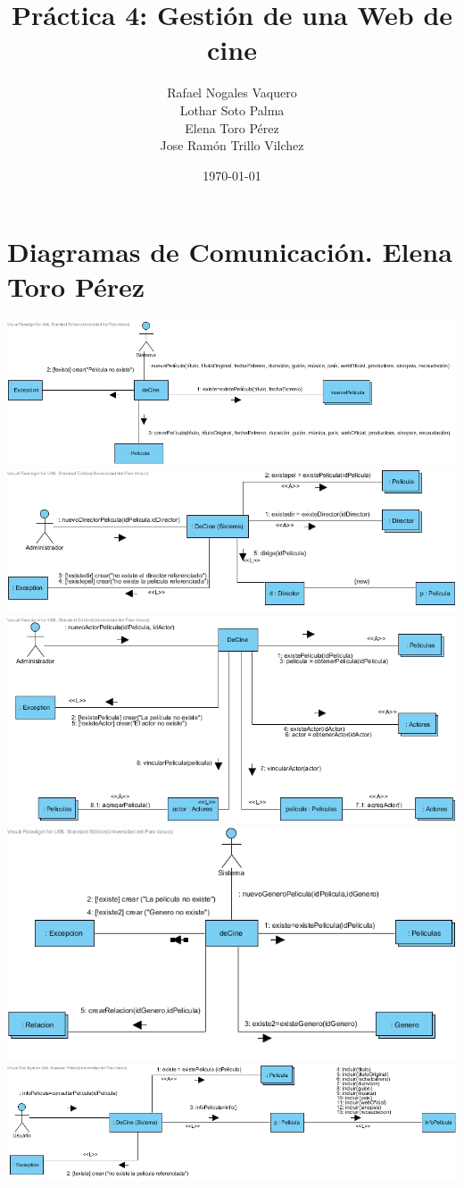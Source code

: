 \documentclass{article}
\title{Práctica 4: Gestión de una Web de cine}
\author{Rafael Nogales Vaquero
\\Lothar Soto Palma
\\Elena Toro Pérez
\\Jose Ramón Trillo Vilchez}
\date{\today}
\begin{document}
\maketitle
\section{Diagramas de Comunicación. Elena Toro Pérez}
\begin{center}
\includegraphics[width=1.3\linewidth]{./E-1}
\includegraphics[width=1.3\linewidth]{./E-2}
\includegraphics[width=1.3\linewidth]{./E-3}
\includegraphics[width=1.3\linewidth]{./E-4}
\includegraphics[width=1.3\linewidth]{./E-5}
\end{center}
\end{document}

